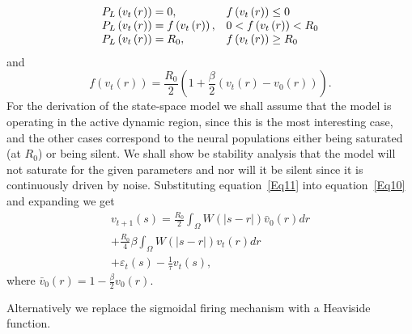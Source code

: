 \documentclass[onecolumn,draftcls]{IEEEtran}
\begin{document}
\begin{equation}\label{Eq11}
\begin{array}{*{20}{c}}
   {{P_{L}}\left( {{v_t}\left( r \right)} \right) = 0,} \hfill & {f\left( {{v_t}\left( r \right)} \right) \le 0} \hfill  \\
   {{P_{L}}\left( {{v_t}\left( r \right)} \right) = f\left( {{v_t}\left( r \right)} \right),} \hfill & {0 < f\left( {{v_t}\left( r \right)} \right) < {R_0}} \hfill  \\
   {{P_{L}}\left( {{v_t}\left( r \right)} \right) = {R_0},} \hfill & {f\left( {{v_t}\left( r \right)} \right) \ge {R_0}} \hfill  \\
\end{array}
\end{equation}
and
\begin{equation}\label{Eq12}
f\left( {{v_t}\left( r \right)} \right) = \frac{{{R_0}}}{2}\left( {1 + \frac{\beta }{2}\left( {{v_t}\left( r \right) - {v_0}\left( r \right)} \right)} \right).
\end{equation}
For the derivation of the state-space model we shall assume that the model is operating in the active dynamic region, since this is the most interesting case, and the other cases correspond to the neural populations either being saturated (at $R_0$) or being silent. We shall show be stability analysis that the model will not saturate for the given parameters and nor will it be silent since it is continuously driven by noise. Substituting equation~\ref{Eq11} into equation~\ref{Eq10} and expanding we get
\begin{align}\label{Eq13}
 {v_{t + 1}}\left( s \right) = \frac{{{R_0}}}{2}\int_\Omega  {W\left( {\left| {s - r} \right|} \right){{\bar v}_0}\left( r \right)dr}  \nonumber \\
  + \frac{{{R_0}}}{4}\beta \int_\Omega  {W\left( {\left| {s - r} \right|} \right){v_t}\left( r \right)dr}  \\
  + {\varepsilon _t}\left( s \right) - \frac{1}{\tau }{v_t}\left( s \right), \nonumber
\end{align}
where ${\bar v_0}\left( r \right) = 1 - \frac{\beta }{2}{v_0}\left( r \right)$.

Alternatively we replace the sigmoidal firing mechanism with a Heaviside function.
\end{document}
